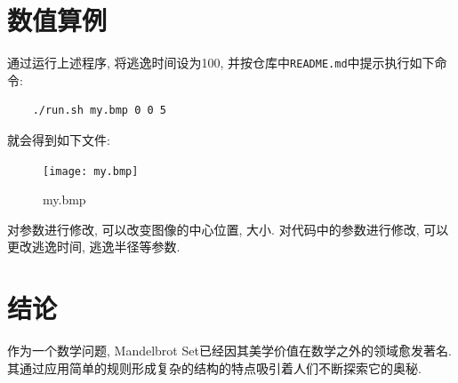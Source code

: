 \documentclass{ctexart}
\begin{document}
\section{数值算例}
通过运行上述程序, 将逃逸时间设为100, 并按仓库中\verb!README.md!中提示执行如下命令: 
\begin{verbatim}
    ./run.sh my.bmp 0 0 5
\end{verbatim}
\par 就会得到如下文件: 
\begin{figure}[!ht]
	\centering
	\texttt{[image: my.bmp]}
	\caption{my.bmp}
\end{figure}
\par 对参数进行修改, 可以改变图像的中心位置, 大小. 对代码中的参数进行修改, 可以更改逃逸时间, 逃逸半径等参数.

\section{结论}
作为一个数学问题, Mandelbrot Set已经因其美学价值在数学之外的领域愈发著名. 其通过应用简单的规则形成复杂的结构的特点吸引着人们不断探索它的奥秘. 




\nocite{enwiki:1094796296}
\nocite{朱华2011分形理论及其应用}
\end{document}
